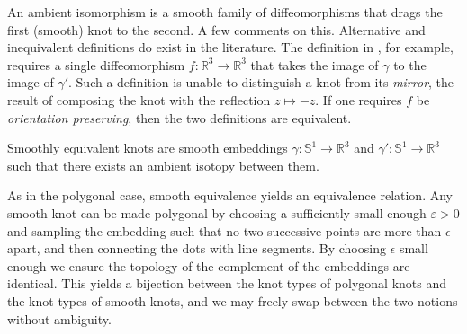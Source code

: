     An ambient isomorphism is a smooth family of diffeomorphisms that
    drags the first (smooth) knot to the second. A few comments on this.
    Alternative and inequivalent definitions do exist in the literature.
    The definition in \cite[p.~4]{CrowellFoxKnotTheory}, for example,
    requires a single diffeomorphism
    $f:\mathbb{R}^{3}\rightarrow\mathbb{R}^{3}$ that
    takes the image of $\gamma$ to the image of $\gamma'$. Such a
    definition is unable to distinguish a knot from its \textit{mirror},
    the result of composing the knot with the reflection $z\mapsto{-z}$.
    If one requires $f$ be \textit{orientation preserving}, then the
    two definitions are equivalent.
    \begin{definition}
        Smoothly equivalent knots are smooth embeddings
        $\gamma:\mathbb{S}^{1}\rightarrow\mathbb{R}^{3}$ and
        $\gamma':\mathbb{S}^{1}\rightarrow\mathbb{R}^{3}$ such that there
        exists an ambient isotopy between them.
    \end{definition}
    As in the polygonal case, smooth equivalence yields an equivalence
    relation. Any smooth knot can be made polygonal by choosing a sufficiently
    small enough $\varepsilon>0$ and sampling the embedding such that no two
    successive points are more than $\epsilon$ apart, and then connecting
    the dots with line segments. By choosing $\epsilon$ small enough we ensure
    the topology of the complement of the embeddings are identical. This yields
    a bijection between the knot types of polygonal knots and the knot types
    of smooth knots, and we may freely swap between the two notions without
    ambiguity.

